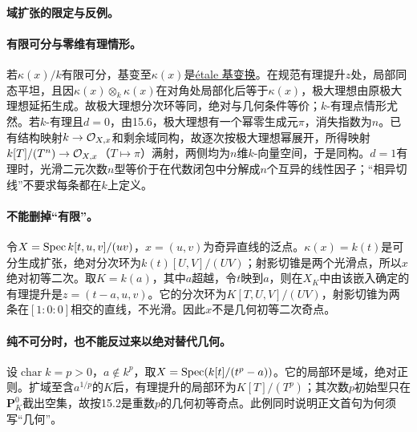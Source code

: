 \paragraph{域扩张的限定与反例。}
\paragraph{有限可分与零维有理情形。}
若$\kappa(x)/k$有限可分，基变至$\kappa(x)$是\href{https://stacks.math.columbia.edu/tag/02GH}{étale 基变换}。在规范有理提升$z$处，局部同态平坦，且因$\kappa(x)\otimes_k\kappa(x)$在对角处局部化后等于$\kappa(x)$，极大理想由原极大理想延拓生成。故极大理想分次环等同，绝对与几何条件等价；$k$-有理点情形尤然。若$k$-有理且$d=0$，由15.6，极大理想有一个幂零生成元$\pi$，消失指数为$n$。已有结构映射$k\to\mathcal O_{X,x}$和剩余域同构，故逐次按极大理想幂展开，所得映射$k[T]/(T^n)\to\mathcal O_{X,x}$（$T\mapsto\pi$）满射，两侧均为$n$维$k$-向量空间，于是同构。$d=1$有理时，光滑二元次数$n$型等价于在代数闭包中分解成$n$个互异的线性因子；“相异切线”不要求每条都在$k$上定义。

\paragraph{不能删掉“有限”。}
令$X=\operatorname{Spec} k[t,u,v]/(uv)$，$x=(u,v)$为奇异直线的泛点。$\kappa(x)=k(t)$是可分生成扩张，绝对分次环为$k(t)[U,V]/(UV)$；射影切锥是两个光滑点，所以$x$绝对初等二次。取$K=k(a)$，其中$a$超越，令$t$映到$a$，则在$X_K$中由该嵌入确定的有理提升是$z=(t-a,u,v)$。它的分次环为$K[T,U,V]/(UV)$，射影切锥为两条在$[1:0:0]$相交的直线，不光滑。因此$x$不是几何初等二次奇点。

\paragraph{纯不可分时，也不能反过来以绝对替代几何。}
设$\operatorname{char}k=p>0$，$a\notin k^p$，取$X=\operatorname{Spec}(k[t]/(t^p-a))$。它的局部环是域，绝对正则。扩域至含$a^{1/p}$的$K$后，有理提升的局部环为$K[T]/(T^p)$；其次数$p$初始型只在$\mathbf P^0_K$截出空集，故按15.2是重数$p$的几何初等奇点。此例同时说明正文首句为何须写“几何”。
\endgroup
